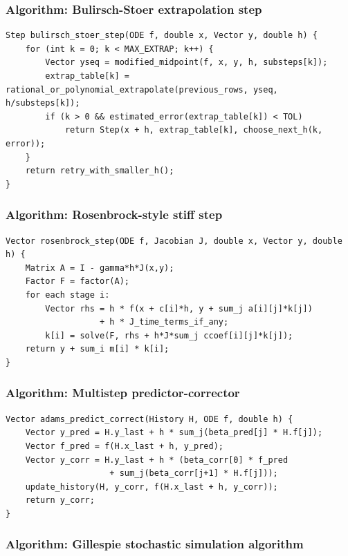 \documentclass[11pt]{article}
\begin{document}
\subsubsection{Algorithm: Bulirsch-Stoer extrapolation step}\label{algorithm-bulirsch-stoer-extrapolation-step}

\begin{verbatim}
Step bulirsch_stoer_step(ODE f, double x, Vector y, double h) {
    for (int k = 0; k < MAX_EXTRAP; k++) {
        Vector yseq = modified_midpoint(f, x, y, h, substeps[k]);
        extrap_table[k] = rational_or_polynomial_extrapolate(previous_rows, yseq, h/substeps[k]);
        if (k > 0 && estimated_error(extrap_table[k]) < TOL)
            return Step(x + h, extrap_table[k], choose_next_h(k, error));
    }
    return retry_with_smaller_h();
}
\end{verbatim}

\subsubsection{Algorithm: Rosenbrock-style stiff step}\label{algorithm-rosenbrock-style-stiff-step}

\begin{verbatim}
Vector rosenbrock_step(ODE f, Jacobian J, double x, Vector y, double h) {
    Matrix A = I - gamma*h*J(x,y);
    Factor F = factor(A);
    for each stage i:
        Vector rhs = h * f(x + c[i]*h, y + sum_j a[i][j]*k[j])
                   + h * J_time_terms_if_any;
        k[i] = solve(F, rhs + h*J*sum_j ccoef[i][j]*k[j]);
    return y + sum_i m[i] * k[i];
}
\end{verbatim}

\subsubsection{Algorithm: Multistep predictor-corrector}\label{algorithm-multistep-predictor-corrector}

\begin{verbatim}
Vector adams_predict_correct(History H, ODE f, double h) {
    Vector y_pred = H.y_last + h * sum_j(beta_pred[j] * H.f[j]);
    Vector f_pred = f(H.x_last + h, y_pred);
    Vector y_corr = H.y_last + h * (beta_corr[0] * f_pred
                     + sum_j(beta_corr[j+1] * H.f[j]));
    update_history(H, y_corr, f(H.x_last + h, y_corr));
    return y_corr;
}
\end{verbatim}

\subsubsection{Algorithm: Gillespie stochastic simulation algorithm}\label{algorithm-gillespie-stochastic-simulation-algorithm}
\end{document}

